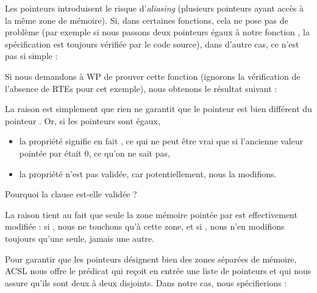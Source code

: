 Les pointeurs introduisent le risque d'\textit{aliasing} (plusieurs pointeurs ayant accès à
la même zone de mémoire). Si, dans certaines fonctions, cela ne pose pas de
problème (par exemple si nous passons deux pointeurs égaux
à notre fonction , la spécification est toujours vérifiée par le
code source), dans d'autre cas, ce n'est pas si simple :






Si nous demandons à WP de prouver cette fonction (ignorons la vérification de
l'absence de RTEs pour cet exemple), nous obtenons le résultat suivant :





La raison est simplement que rien ne garantit que le pointeur  est bien
différent du pointeur . Or, si les pointeurs sont égaux,



\begin{itemize}
\item la propriété  signifie en fait
, ce qui ne peut être vrai que si l'ancienne valeur
pointée par  était 0, ce qu'on ne sait pas,
\item la propriété  n'est pas validée, car potentiellement,
nous la modifions.
\end{itemize}


\begin{Question}
Pourquoi la clause  est-elle validée ?

La raison tient au fait que seule la zone mémoire pointée par  est
effectivement modifiée : si , nous ne touchons qu'à cette
zone, et si , nous n'en modifions toujours qu'une seule,
jamais une autre.
\end{Question}


Pour garantir que les pointeurs désignent bien des zones séparées de mémoire,
ACSL nous offre le prédicat  qui reçoit en entrée
une liste de pointeurs et qui nous assure qu'ils sont deux à deux disjoints.
Dans notre cas, nous spécifierions :






